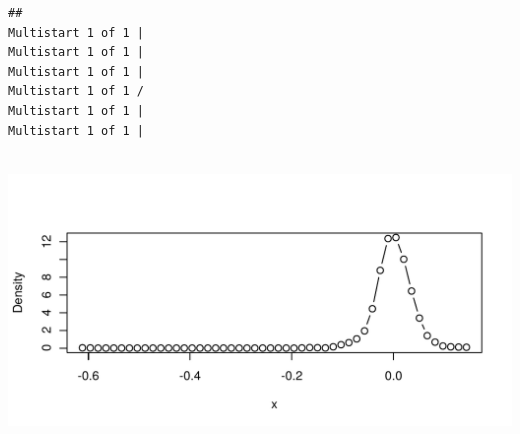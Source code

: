 \begin{knitrout}
\color{fgcolor}\begin{kframe}
\begin{alltt}
 \hlkwb{<-} \hlstd{(}
  
  \hlstd{=} \hlstd{,}
  \hlstd{=} \hlstd{,}
  \hlstd{=} 
\hlstd{)}
\end{alltt}
\begin{verbatim}
## 
Multistart 1 of 1 |
Multistart 1 of 1 |
Multistart 1 of 1 |
Multistart 1 of 1 /
Multistart 1 of 1 |
Multistart 1 of 1 |
                   
\end{verbatim}
\begin{alltt}
 \hlkwb{<-} 

  \hlstd{=} \hlstd{)}
\end{alltt}
\end{kframe}
\includegraphics[width=\maxwidth]{figure/unnamed-chunk-32-1} 

\end{knitrout}
